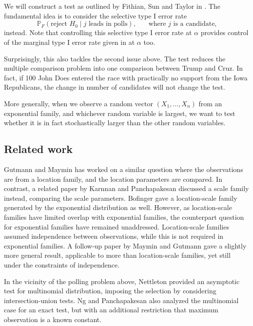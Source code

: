 \documentclass[11pt]{article}
\newcommand{\PP}{\mathbb{P}}
\begin{document}
We will construct a test as outlined by Fithian, Sun and Taylor in \cite{Fithian:2014ws}. The fundamental idea is to consider the selective type I error rate
$$\PP_F\left(\text{reject } H_0 \middle| j \text{ leads in polls} \right), ~~~~~~~~ \text{where $j$ is a candidate,}$$
instead. Note that controlling this selective type I error rate at $\alpha$ provides control of the marginal type I error rate given in  at $\alpha$ too.

Surprisingly, this also tackles the second issue above. The test reduces the multiple comparison problem into one comparison between Trump and Cruz. In fact, if 100 John Does entered the race with practically no support from the Iowa Republicans, the change in number of candidates will not change the test.

More generally, when we observe a random vector $(X_1, \ldots, X_n)$ from an exponential family, and whichever random variable is largest, we want to test whether it is in fact stochastically larger than the other random variables.

\subsection{Related work}

Gutmann and Maymin \cite{Gutmann:1987fk} has worked on a similar question where the observations are from a location family, and the location parameters are compared. In contrast, a related paper by Karnnan and Panchapakesan \cite{Karnnan:2009iv} discussed a scale family instead, comparing the scale parameters. Bofinger \cite{Bofinger:1991hv} gave a location-scale family generated by the exponential distribution as well. However, as location-scale families have limited overlap with exponential families, the counterpart question for exponential families have remained unaddressed. Location-scale families assumed independence between observations, while this is not required in exponential families. A follow-up paper by Maymin and Gutmann \cite{Maymin:1992fz} gave a slightly more general result, applicable to more than location-scale families, yet still under the constraints of independence.

In the vicinity of the polling problem above, Nettleton \cite{Nettleton:2009ht} provided an asymptotic test for multinomial distribution, imposing the selection by considering intersection-union tests. Ng and Panchapakesan \cite{Ng:2007cn} also analyzed the multinomial case for an exact test, but with an additional restriction that maximum observation is a known constant.
\end{document}
